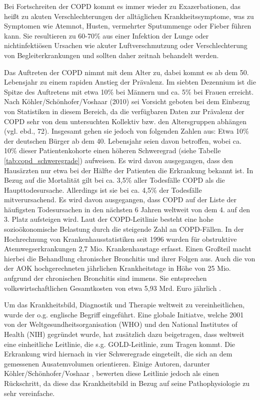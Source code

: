 Bei Fortschreiten der COPD kommt es immer wieder zu Exazerbationen, das heißt zu akuten Verschlechterungen der alltäglichen Krankheitssymptome, was zu Symptomen wie Atemnot, Husten, vermehrter Sputummenge oder Fieber führen kann. Sie resultieren zu 60-70\% aus einer Infektion der Lunge oder nichtinfektiösen Ursachen wie akuter Luftverschmutzung oder Verschlechterung von Begleiterkrankungen und sollten daher zeitnah behandelt werden.

Das Auftreten der COPD nimmt mit dem Alter zu, dabei kommt es ab dem 50. Lebensjahr zu einem rapiden Anstieg der Prävalenz. Im siebten Dezennium ist die Spitze des Auftretens mit etwa 10\% bei Männern und ca. 5\% bei Frauen erreicht\autocite[vgl.][153]{lorenz2009}. Nach Köhler/Schönhofer/Voshaar (2010) sei Vorsicht geboten bei dem Einbezug von Statistiken in diesem Bereich, da die verfügbaren Daten zur Prävalenz der COPD sehr von dem untersuchten Kollektiv bzw. den Altersgruppen abhängen (vgl. ebd., 72). Insgesamt gehen sie jedoch von folgenden Zahlen aus: Etwa 10\% der deutschen Bürger ab dem 40. Lebensjahr seien davon betroffen, wobei ca. 10\% dieser Patientenkohorte einen höheren Schweregrad (siehe Tabelle \ref{tab:copd_schweregrade})  aufweisen. Es wird davon ausgegangen, dass den Hausärzten nur etwa bei der Hälfte der Patienten die Erkrankung bekannt ist.
In Bezug auf die Mortalität gilt bei ca. 3,5\% aller Todesfälle COPD als die Haupttodesursache. Allerdings ist sie bei ca. 4,5\% der Todesfälle mitverursachend. Es wird davon ausgegangen, dass COPD auf der Liste der häufigsten Todesursachen in den nächsten 6 Jahren weltweit von dem 4. auf den 3. Platz aufsteigen wird.
Laut der COPD-Leitlinie besteht eine hohe sozioökonomische Belastung durch die steigende Zahl an COPD-Fällen. In der Hochrechnung von Krankenhausstatistiken seit 1996 wurden für obstruktive Atemwegserkrankungen 2,7 Mio. Krankenhaustage erfasst. Einen Großteil macht hierbei die Behandlung chronischer Bronchitis und ihrer Folgen aus. Auch die von der AOK hochgerechneten jährlichen Krankheitstage in Höhe von 25 Mio. aufgrund der chronischen Bronchitis sind immens. Sie entsprechen volkswirtschaftlichen Gesamtkosten von etwa 5,93 Mrd. Euro jährlich \autocite[vgl.][e4]{vogelmeier2007}.

Um das Krankheitsbild, Diagnostik und Therapie weltweit zu vereinheitlichen, wurde der o.g. englische Begriff eingeführt. Eine globale Initiatve, welche 2001 von der Weltgesundheitsorganisation (WHO) und den National Institutes of Health (NIH) gegründet wurde, hat zusätzlich dazu beigetragen, dass weltweit eine einheitliche Leitlinie, die s.g. GOLD-Leitlinie, zum Tragen kommt. Die Erkrankung wird hiernach in vier Schweregrade eingeteilt, die sich an dem gemessenen Ausatemvolumen orientieren. Einige Autoren, darunter Köhler/Schönhofer/Voshaar \autocite[vgl.][75]{koehler2010}, bewerten diese Leitlinie jedoch als einen Rückschritt, da diese das Krankheitsbild in Bezug auf seine Pathophysiologie zu sehr vereinfache.


